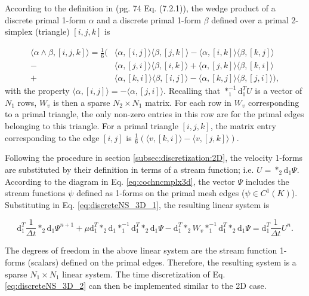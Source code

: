 \documentclass[final,12pt,times]{elsarticle}
\begin{document}
According to the definition in \cite{hirani2003discrete} (pg. 74 Eq. (7.2.1)), the wedge product of a discrete primal 1-form $\alpha$ and a discrete primal 1-form $\beta$ defined over a primal 2-simplex (triangle) $[i,j,k]$ is 

\begin{equation}
\label{eq:discreteWedge3D}
\begin{aligned}
\langle \alpha \wedge \beta , [i,j,k] \rangle  = \frac{1}{6} (  &\langle \alpha, [i,j] \rangle  \langle \beta, [j,k] \rangle - \langle \alpha, [i,k] \rangle  \langle \beta, [k,j] \rangle \\ 
- & \langle \alpha, [j,i] \rangle  \langle \beta, [i,k] \rangle  + \langle \alpha, [j,k] \rangle  \langle \beta, [k,i] \rangle \\
+ & \langle \alpha, [k,i] \rangle  \langle \beta, [i,j] \rangle -\langle \alpha, [k,j] \rangle  \langle \beta, [j,i] \rangle ),  
\end{aligned}
\end{equation}
with the property $\langle \alpha, [i,j] \rangle = - \langle \alpha, [j,i] \rangle$. Recalling that $\ast^{-1}_1 \textrm{d}^T_1 U$ is a vector of $N_1$ rows, $W_v$ is then a sparse $N_2 \times N_1$ matrix. For each row in $W_v$ corresponding to a primal triangle, the only non-zero entries in this row are for the primal edges belonging to this triangle. For a primal triangle $[i,j,k]$, the matrix entry corresponding to the edge $[i,j]$ is $\frac{1}{6} ( \langle v, [k,i] \rangle - \langle v, [j,k] \rangle )$.

Following the procedure in section \ref{subsec:discretization:2D}, the velocity 1-forms are substituted by their definition in terms of a stream function; i.e. $U = \ast_2 \textrm{d}_1 \Psi$. According to the diagram in Eq. \eqref{eq:cochncmplx3d}, the vector $\Psi$ includes the stream functions $\psi$ defined as 1-forms on the primal mesh edges ($\psi \in C^1(K)$). Substituting in Eq. \eqref{eq:discreteNS_3D_1}, the resulting linear system is    

\begin{equation}
\label{eq:discreteNS_3D_2}
 \textrm{d}^T_1 \frac{1}{\Delta t} \ast_2 \textrm{d}_1 \Psi^{n+1} + \mu \textrm{d}^T_1 \ast_2 \textrm{d}_1 \ast^{-1}_1 \textrm{d}^T_1 \ast_2 \textrm{d}_1 \Psi -  \textrm{d}^T_1 \ast_2 W_v \ast^{-1}_1 \textrm{d}^T_1 \ast_2 \textrm{d}_1 \Psi = \textrm{d}^T_1 \frac{1}{\Delta t} U^n.  
\end{equation}

The degrees of freedom in the above linear system are the stream function 1-forms (scalars) defined on the primal edges. Therefore, the resulting system is a sparse $N_1 \times N_1$ linear system. The time discretization of Eq. \eqref{eq:discreteNS_3D_2} can then be implemented similar to the 2D case.
\end{document}
